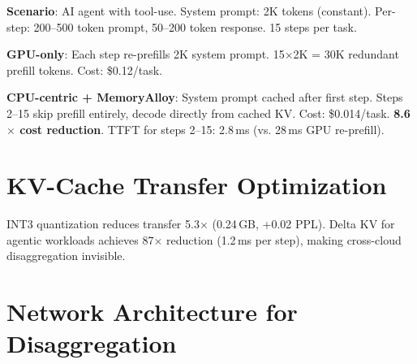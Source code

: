 \documentclass[conference,10pt]{IEEEtran}
\begin{document}
\textbf{Scenario}: AI agent with tool-use. System prompt: 2K tokens (constant). Per-step: 200--500 token prompt, 50--200 token response. 15 steps per task.

\textbf{GPU-only}: Each step re-prefills 2K system prompt. 15$\times$2K = 30K redundant prefill tokens. Cost: \$0.12/task.

\textbf{CPU-centric + MemoryAlloy}: System prompt cached after first step. Steps 2--15 skip prefill entirely, decode directly from cached KV. Cost: \$0.014/task. \textbf{8.6$\times$ cost reduction}. TTFT for steps 2--15: 2.8\,ms (vs. 28\,ms GPU re-prefill).

\section{KV-Cache Transfer Optimization}
\label{sec:transfer}

\begin{table}[!htbp]
\caption{KV-Cache Transfer Mechanisms (Llama-70B, 128K, GQA)}
\label{tab:transfer}
\centering\scriptsize
{}
\end{table}

INT3 quantization reduces transfer 5.3$\times$ (0.24\,GB, +0.02 PPL). Delta KV for agentic workloads achieves 87$\times$ reduction (1.2\,ms per step), making cross-cloud disaggregation invisible.

\section{Network Architecture for Disaggregation}
\label{sec:network}
\end{document}
